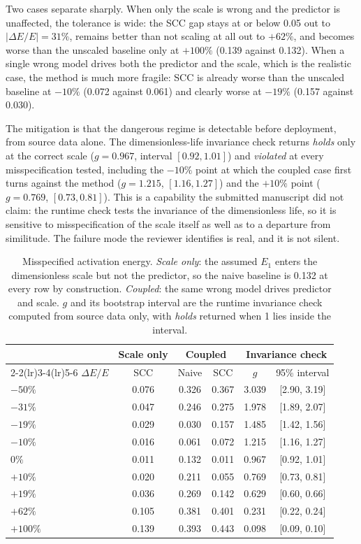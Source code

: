 \documentclass[review,times]{elsarticle}
\theoremstyle{definition}
\theoremstyle{remark}
\begin{document}
Two cases separate sharply. When only the scale is wrong and the predictor is unaffected, the
tolerance is wide: the SCC gap stays at or below 0.05 out to $\lvert\Delta E/E\rvert=31\%$, remains
better than not scaling at all out to $+62\%$, and becomes worse than the unscaled baseline only at
$+100\%$ (0.139 against 0.132). When a single wrong model drives both the predictor and the scale,
which is the realistic case, the method is much more fragile: SCC is already worse than the unscaled
baseline at $-10\%$ (0.072 against 0.061) and clearly worse at $-19\%$ (0.157 against 0.030).

The mitigation is that the dangerous regime is detectable before deployment, from source data alone.
The dimensionless-life invariance check returns \emph{holds} only at the correct scale ($g=0.967$,
interval $[0.92,1.01]$) and \emph{violated} at every misspecification tested, including the $-10\%$
point at which the coupled case first turns against the method ($g=1.215$, $[1.16,1.27]$) and the
$+10\%$ point ($g=0.769$, $[0.73,0.81]$). This is a capability the submitted manuscript did not
claim: the runtime check tests the invariance of the dimensionless life, so it is sensitive to
misspecification of the scale itself as well as to a departure from similitude. The failure mode the
reviewer identifies is real, and it is not silent.

\begin{table}[t]\centering\footnotesize
\setlength{\tabcolsep}{7pt}\renewcommand{\arraystretch}{1.2}
\caption{Misspecified activation energy. \emph{Scale only}: the assumed $E_1$ enters the
dimensionless scale but not the predictor, so the naive baseline is 0.132 at every row by
construction. \emph{Coupled}: the same wrong model drives predictor and scale. $g$ and its bootstrap
interval are the runtime invariance check computed from source data only, with \emph{holds} returned
when 1 lies inside the interval.}\label{tab:misspec}
\begin{tabular}{@{}lccccc@{}}\toprule
& Scale only & \multicolumn{2}{c}{Coupled} & \multicolumn{2}{c}{Invariance check} \\
\cmidrule(lr){2-2}\cmidrule(lr){3-4}\cmidrule(lr){5-6}
$\Delta E/E$ & SCC & Naive & SCC & $g$ & 95\% interval \\\midrule
$-50\%$  & 0.076 & 0.326 & 0.367 & 3.039 & [2.90, 3.19] \\
$-31\%$  & 0.047 & 0.246 & 0.275 & 1.978 & [1.89, 2.07] \\
$-19\%$  & 0.029 & 0.030 & 0.157 & 1.485 & [1.42, 1.56] \\
$-10\%$  & 0.016 & 0.061 & 0.072 & 1.215 & [1.16, 1.27] \\
$0\%$    & 0.011 & 0.132 & 0.011 & 0.967 & [0.92, 1.01] \\
$+10\%$  & 0.020 & 0.211 & 0.055 & 0.769 & [0.73, 0.81] \\
$+19\%$  & 0.036 & 0.269 & 0.142 & 0.629 & [0.60, 0.66] \\
$+62\%$  & 0.105 & 0.381 & 0.401 & 0.231 & [0.22, 0.24] \\
$+100\%$ & 0.139 & 0.393 & 0.443 & 0.098 & [0.09, 0.10] \\\bottomrule
\end{tabular}
\end{table}
\end{document}

